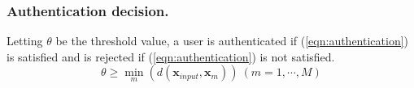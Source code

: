 \documentclass[sigchi,authordraft]{acmart}
\begin{document}



\subsubsection{Authentication decision.}
Letting $\theta$ be the threshold value, a user is authenticated if (\ref{eqn:authentication}) is satisfied and is rejected if (\ref{eqn:authentication}) is not satisfied.
\begin{equation}
\label{eqn:authentication}
  \theta \geq \min_m(d(\bm{x}_{input},\bm{x}_m))~(m=1,\cdots,M)
\end{equation}



\end{document}
